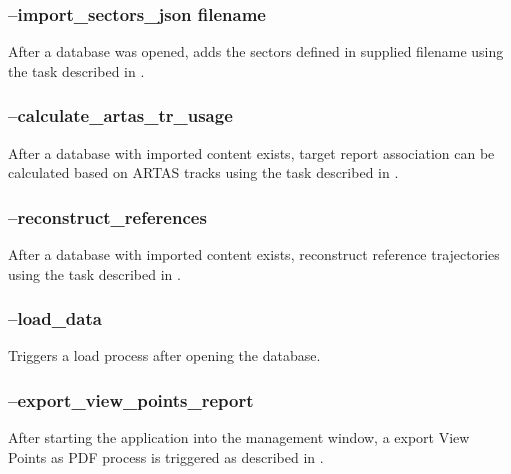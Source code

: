 % 
% 


\subsubsection{--import\_sectors\_json  filename}

After a database was opened, adds the sectors defined in supplied filename using the task described in .

\subsubsection{--calculate\_artas\_tr\_usage}

After a database with imported content exists, target report association can be calculated based on ARTAS tracks using the task described in .

\subsubsection{--reconstruct\_references}

After a database with imported content exists, reconstruct reference trajectories using the task described in .

\subsubsection{--load\_data}

Triggers a load process after opening the database.

\subsubsection{--export\_view\_points\_report}

After starting the application into the management window, a export View Points as PDF process is triggered as described in
.


